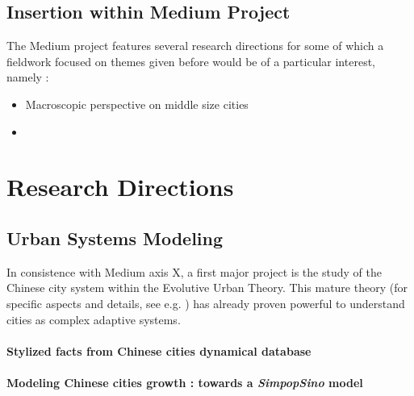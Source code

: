 \subsection{Insertion within Medium Project}

The Medium project features several research directions for some of which a fieldwork focused on themes given before would be of a particular interest, namely :

\begin{itemize}
\item Macroscopic perspective on middle size cities %
\item %
\end{itemize}




\section{Research Directions}

\subsection{Urban Systems Modeling}

In consistence with Medium axis X, a first major project is the study of the Chinese city system within the Evolutive Urban Theory. This mature theory (for specific aspects and details, see e.g. %
) has already proven powerful to understand cities as complex adaptive systems.



%
%


\paragraph{Stylized facts from Chinese cities dynamical database}


\paragraph{Modeling Chinese cities growth : towards a \textit{SimpopSino} model}


